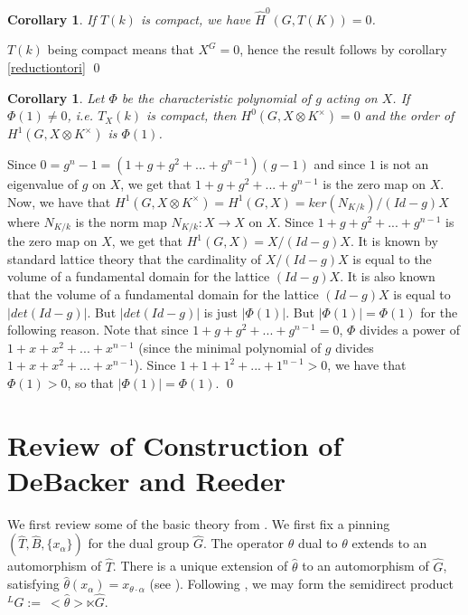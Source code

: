 \documentclass[11pt]{amsart}
\theoremstyle{plain}
\newtheorem{corollary}[enumi]{Corollary}
\begin{document}
\begin{corollary}
If $T(k)$ is compact, we have $\hat{H}^0(G, T(K)) = 0$.
\end{corollary}

\proof
$T(k)$ being compact means that $X^G = 0$, hence the result follows by corollary \ref{reductiontori}
\qed

\begin{corollary} Let $\Phi$ be the characteristic polynomial of $g$ acting on $X$. If $\Phi(1)\neq 0$,
i.e. $T_X(k)$ is compact,
then $H^0(G, X\otimes K^{\times})=0$ and the order of $H^1(G, X\otimes K^{\times})$ is $\Phi(1)$.
\end{corollary}

\proof
Since $0 = g^n - 1 = (1 + g + g^2 + ... + g^{n-1})(g-1)$ and since $1$ is not an eigenvalue of $g$ on $X$, we get that $1 + g + g^2 + ... + g^{n-1}$ is the zero map on $X$.  Now, we have that $H^1(G, X\otimes K^{\times}) = H^1(G, X) = ker(N_{K/k}) / (Id - g)X$ where $N_{K/k}$ is the norm map $N_{K/k} : X \rightarrow X$ on $X$. Since $1 + g + g^2 + ... + g^{n-1}$ is the zero map on $X$, we get that $H^1(G, X) = X / (Id - g)X$.
It is known by standard lattice theory that the cardinality of $X / (Id - g)X$ is equal to the volume of a fundamental domain for the lattice $(Id - g)X$.  It is also known that the volume of a fundamental domain for the lattice $(Id - g)X$ is equal to $|det(Id - g)|$.  But $|det(Id - g)|$ is just $|\Phi(1)|$.  But $|\Phi(1)| = \Phi(1)$ for the following reason.  Note that since $1 + g + g^2 + ... + g^{n-1} = 0$, $\Phi$ divides a power of $1 + x + x^2 + ... + x^{n-1}$ (since the minimal polynomial of $g$ divides $1 + x + x^2 + ... + x^{n-1}$).  Since $1 + 1 + 1^2 + ... + 1^{n-1} > 0$, we have that $\Phi(1) > 0$, so that $|\Phi(1)| = \Phi(1)$.
\qed

\section{Review of Construction of DeBacker and Reeder}\label{preliminaries}

We first review some of the basic theory from \cite{debackerreeder}.  We first fix a pinning $(\hat{T}, \hat{B}, \{x_{\alpha} \})$ for the dual group $\hat{G}$.  The operator $\hat{\theta}$ dual to $\theta$ extends to an automorphism of $\hat{T}$.  There is a unique extension of $\hat{\theta}$ to an automorphism of $\hat{G}$, satisfying $\hat{\theta}(x_{\alpha}) = x_{\theta \cdot \alpha}$ (see \cite[section 3.2]{debackerreeder}).  Following \cite{debackerreeder}, we may form the semidirect product ${}^L G := \ <\hat{\theta}> \ltimes \hat{G}$.
\end{document}
